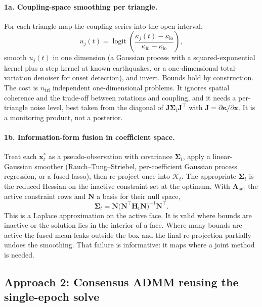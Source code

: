 \documentclass[11pt]{article}
\newcommand{\vect}[1]{\bm{#1}}
\newcommand{\mat}[1]{\mathbf{#1}}
\DeclareMathOperator{\logit}{logit}
\begin{document}
\paragraph{1a. Coupling-space smoothing per triangle.}
For each triangle map the coupling series into the open interval,
\begin{equation}
u_j(t) = \logit\!\left(\frac{\kappa_j(t) - \kappa_{\mathrm{lo}}}{\kappa_{\mathrm{hi}} - \kappa_{\mathrm{lo}}}\right),
\end{equation}
smooth $u_j(t)$ in one dimension (a Gaussian process with a squared-exponential kernel plus a step kernel at known earthquakes, or a one-dimensional total-variation denoiser for onset detection), and invert. Bounds hold by construction. The cost is $n_{\mathrm{tri}}$ independent one-dimensional problems. It ignores spatial coherence and the trade-off between rotations and coupling, and it needs a per-triangle noise level, best taken from the diagonal of $\mat{J}\mat{\Sigma}_t\mat{J}^{\!\top}$ with $\mat{J} = \partial\vect{\kappa}/\partial\vect{x}$. It is a monitoring product, not a posterior.

\paragraph{1b. Information-form fusion in coefficient space.}
Treat each $\vect{x}_t^\ast$ as a pseudo-observation with covariance $\mat{\Sigma}_t$, apply a linear-Gaussian smoother (Rauch--Tung--Striebel, per-coefficient Gaussian process regression, or a fused lasso), then re-project once into $\mathcal{K}_t$. The appropriate $\mat{\Sigma}_t$ is the reduced Hessian on the inactive constraint set at the optimum. With $\mat{A}_{\mathrm{act}}$ the active constraint rows and $\mat{N}$ a basis for their null space,
\begin{equation}
\mat{\Sigma}_t = \mat{N}\bigl(\mat{N}^{\!\top}\mat{H}_t\mat{N}\bigr)^{-1}\mat{N}^{\!\top}.
\label{eq:reducedhessian}
\end{equation}
This is a Laplace approximation on the active face. It is valid where bounds are inactive or the solution lies in the interior of a face. Where many bounds are active the fused mean leaks outside the box and the final re-projection partially undoes the smoothing. That failure is informative: it maps where a joint method is needed.

\subsection{Approach 2: Consensus ADMM reusing the single-epoch solve}
\end{document}

